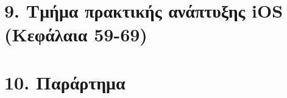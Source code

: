 \documentclass[11pt,a4paper,openany]{book}
\begin{document}
\part*{9. Τμήμα πρακτικής ανάπτυξης iOS (Κεφάλαια 59-69)}











\appendix
\part*{10. Παράρτημα}









\end{document}
